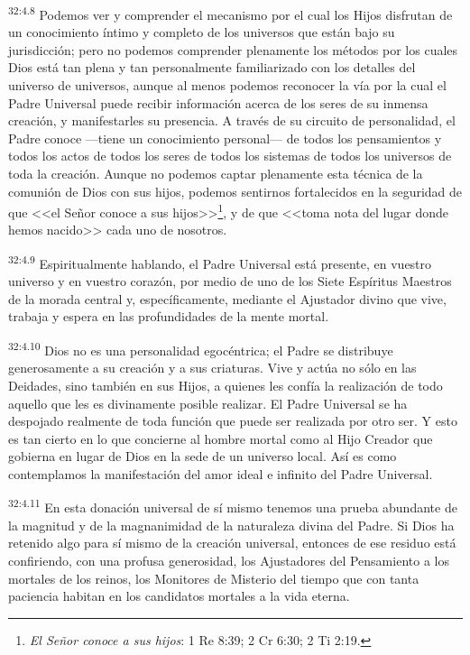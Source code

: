 \par
\textsuperscript{32:4.8} Podemos ver y comprender el mecanismo por el cual los Hijos disfrutan de un conocimiento íntimo y completo de los universos que están bajo su jurisdicción; pero no podemos comprender plenamente los métodos por los cuales Dios está tan plena y tan personalmente familiarizado con los detalles del universo de universos, aunque al menos podemos reconocer la vía por la cual el Padre Universal puede recibir información acerca de los seres de su inmensa creación, y manifestarles su presencia. A través de su circuito de personalidad, el Padre conoce ---tiene un conocimiento personal--- de todos los pensamientos y todos los actos de todos los seres de todos los sistemas de todos los universos de toda la creación. Aunque no podemos captar plenamente esta técnica de la comunión de Dios con sus hijos, podemos sentirnos fortalecidos en la seguridad de que <<el Señor conoce a sus hijos>>\footnote{\textit{El Señor conoce a sus hijos}: 1 Re 8:39; 2 Cr 6:30; 2 Ti 2:19.}, y de que <<toma nota del lugar donde hemos nacido>> cada uno de nosotros.

\par
\textsuperscript{32:4.9} Espiritualmente hablando, el Padre Universal está presente, en vuestro universo y en vuestro corazón, por medio de uno de los Siete Espíritus Maestros de la morada central y, específicamente, mediante el Ajustador divino que vive, trabaja y espera en las profundidades de la mente mortal.

\par
\textsuperscript{32:4.10} Dios no es una personalidad egocéntrica; el Padre se distribuye generosamente a su creación y a sus criaturas. Vive y actúa no sólo en las Deidades, sino también en sus Hijos, a quienes les confía la realización de todo aquello que les es divinamente posible realizar. El Padre Universal se ha despojado realmente de toda función que puede ser realizada por otro ser. Y esto es tan cierto en lo que concierne al hombre mortal como al Hijo Creador que gobierna en lugar de Dios en la sede de un universo local. Así es como contemplamos la manifestación del amor ideal e infinito del Padre Universal.

\par
\textsuperscript{32:4.11} En esta donación universal de sí mismo tenemos una prueba abundante de la magnitud y de la magnanimidad de la naturaleza divina del Padre. Si Dios ha retenido algo para sí mismo de la creación universal, entonces de ese residuo está confiriendo, con una profusa generosidad, los Ajustadores del Pensamiento a los mortales de los reinos, los Monitores de Misterio del tiempo que con tanta paciencia habitan en los candidatos mortales a la vida eterna.


